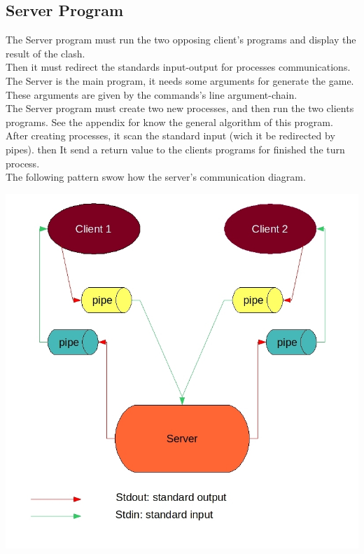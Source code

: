 \documentclass[11pt]{sample}
\begin{document}
\subsection{Server Program}
The Server program must run the two opposing client's programs and display the result of the clash.\\ Then it must redirect the standards input-output for processes communications. The Server is the main program, it needs some arguments for generate the game. These arguments are given by the commands's line argument-chain. \\The Server program must create two new processes, and then run the two clients programs. See the appendix  for know the general algorithm of this program. After creating processes, it scan the standard input (wich it be redirected by pipes\footnotemark). then It send a return value to the clients programs for finished the turn process.
\\The following pattern swow how the server's communication diagram.
\begin{center}\includegraphics[height=22\baselineskip]{img/pipe_model.jpg}
\end{center}
\newpage
\end{document}
